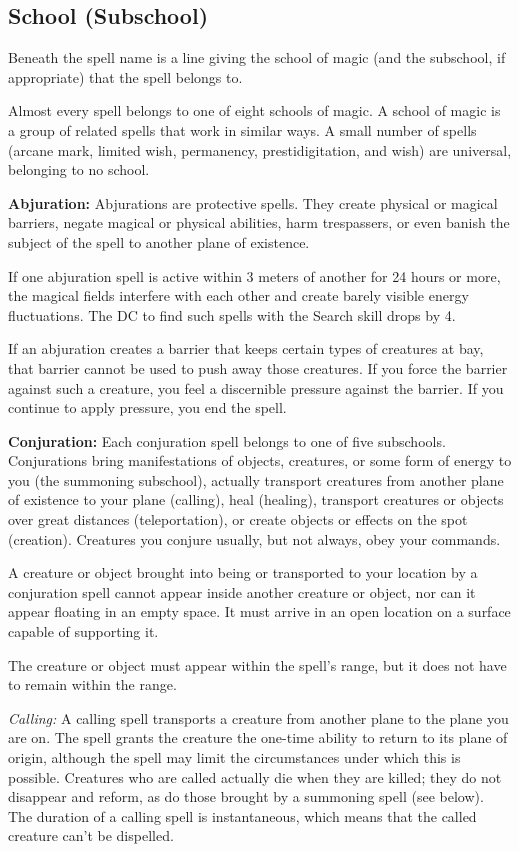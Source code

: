 \subsection{School (Subschool)}
Beneath the spell name is a line giving the school of magic (and the subschool, if appropriate) that the spell belongs to.

Almost every spell belongs to one of eight schools of magic. A school of magic is a group of related spells that work in similar ways. A small number of spells (arcane mark, limited wish, permanency, prestidigitation, and wish) are universal, belonging to no school.

\textbf{Abjuration:} Abjurations are protective spells. They create physical or magical barriers, negate magical or physical abilities, harm trespassers, or even banish the subject of the spell to another plane of existence.

If one abjuration spell is active within 3 meters of another for 24 hours or more, the magical fields interfere with each other and create barely visible energy fluctuations. The DC to find such spells with the Search skill drops by 4.

If an abjuration creates a barrier that keeps certain types of creatures at bay, that barrier cannot be used to push away those creatures. If you force the barrier against such a creature, you feel a discernible pressure against the barrier. If you continue to apply pressure, you end the spell.

\textbf{Conjuration:} Each conjuration spell belongs to one of five subschools. Conjurations bring manifestations of objects, creatures, or some form of energy to you (the summoning subschool), actually transport creatures from another plane of existence to your plane (calling), heal (healing), transport creatures or objects over great distances (teleportation), or create objects or effects on the spot (creation). Creatures you conjure usually, but not always, obey your commands.

A creature or object brought into being or transported to your location by a conjuration spell cannot appear inside another creature or object, nor can it appear floating in an empty space. It must arrive in an open location on a surface capable of supporting it.

The creature or object must appear within the spell's range, but it does not have to remain within the range.

\textit{Calling:} A calling spell transports a creature from another plane to the plane you are on. The spell grants the creature the one-time ability to return to its plane of origin, although the spell may limit the circumstances under which this is possible. Creatures who are called actually die when they are killed; they do not disappear and reform, as do those brought by a summoning spell (see below). The duration of a calling spell is instantaneous, which means that the called creature can't be dispelled.

